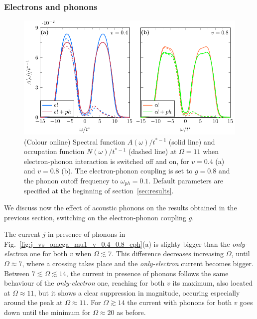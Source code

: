 \documentclass[aps,prb,groupedaddress,showpacs,twocolumn,superscriptaddress,10pt]{revtex4-2}
\begin{document}
\subsubsection{Electrons and phonons}   
\label{sec:E0_2_electrons_phonons} 

\begin{figure}[ht]
\includegraphics[width=\linewidth]{./figures_Paper1/spec_filling_mu1_v_0.4_0.8_O_11_eph.pdf}
\caption{(Colour online) Spectral function $A(\omega)/t^{* -1}$ (solid line) and occupation function $N(\omega)/t^{* -1}$ (dashed line) at $\Omega=11$ when electron-phonon interaction is switched off and on, for $v=0.4$ (a) and $v=0.8$ (b). The electron-phonon coupling is set to $g=0.8$ and the phonon cutoff frequency to $\omega_{ph}=0.1$. Default parameters are specified at the beginning of section~\ref{sec:results}.} 
\label{fig:spec_filling_mu1_v_0.4_0.8_O_11_eph}
\end{figure} 
 



We discuss now the effect of acoustic phonons on the results obtained in the previous section, switching on the electron-phonon coupling $g$. 
 
The current $j$ in presence of phonons in Fig.~\ref{fig:j_vs_omega_mu1_v_0.4_0.8_eph}(a) is slighty bigger than the \emph{only-electron} one for both $v$ when $\Omega\lesssim7$. This difference decreases increasing $\Omega$, until $\Omega\approx7$,  where a crossing takes place and the \emph{only-electron} current becomes bigger. Between $7\lesssim\Omega\lesssim14$, the current in presence of phonons follows the same behaviour of the \emph{only-electron} one, reaching for both $v$ its maximum, also located at $\Omega\approx 11$, but it shows a clear suppression in magnitude, occuring especially around the peak at $\Omega\approx 11$. For $\Omega\gtrsim14$ the current with phonons for both $v$ goes down until the minimum for $\Omega\approx20$ as before.
\end{document}
